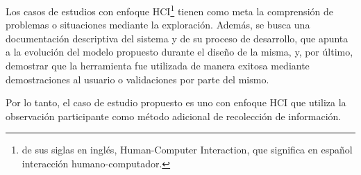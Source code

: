 Los casos de estudios con enfoque HCI\footnote{de sus siglas en inglés, Human-Computer Interaction, que significa en español interacción humano-computador.} tienen como meta la comprensión de problemas o situaciones mediante la exploración. Además, se busca una documentación descriptiva del sistema y de su proceso de desarrollo, que apunta a la evolución del modelo propuesto durante el diseño de la misma, y, por último, demostrar que la herramienta fue utilizada de manera exitosa mediante demostraciones al usuario o validaciones por parte del mismo\citep{lazar_research_2010}. 

Por lo tanto, el caso de estudio propuesto es uno con enfoque HCI que utiliza la observación participante como método adicional de recolección de información.